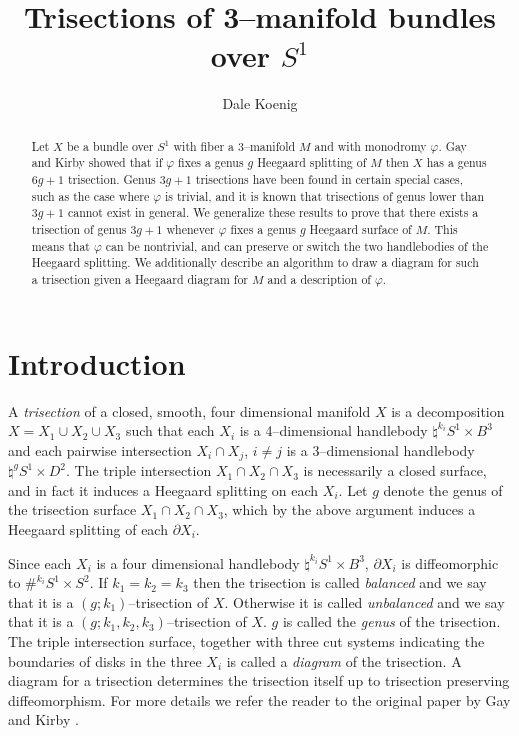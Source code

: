\documentclass[12pt]{amsart}
\newcommand{\del}{\partial }
\theoremstyle{definition}
\theoremstyle{remark}
\begin{document}
\title{Trisections of 3--manifold bundles over $S^1$}
\author{Dale Koenig}
\date{}


\begin{abstract}
Let $X$ be a bundle over $S^1$ with fiber a 3--manifold $M$ and with monodromy $\varphi$.  Gay and Kirby showed that if $\varphi$ fixes a genus $g$ Heegaard splitting of $M$ then $X$ has a genus $6g+1$ trisection.  Genus $3g+1$ trisections have been found in certain special cases, such as the case where $\varphi$ is trivial, and it is known that trisections of genus lower than $3g+1$ cannot exist in general.  We generalize these results to prove that there exists a trisection of genus $3g+1$ whenever $\varphi$ fixes a genus $g$ Heegaard surface of $M$.  This means that $\varphi$ can be nontrivial, and can preserve or switch the two handlebodies of the Heegaard splitting.  We additionally describe an algorithm to draw a diagram for such a trisection given a Heegaard diagram for $M$ and a description of $\varphi$.
\end{abstract}

\maketitle

\section{Introduction}
A \emph{trisection} of a closed, smooth, four dimensional manifold $X$ is a decomposition $X = X_1 \cup X_2 \cup X_3$ such that each $X_i$ is a 4--dimensional handlebody $\natural^{k_i} S^1 \times B^3$ and each pairwise intersection $X_i \cap X_j$, $i \not = j$ is a 3--dimensional handlebody $\natural^g S^1 \times D^2$.  The triple intersection $X_1 \cap X_2 \cap X_3$ is necessarily a closed surface, and in fact it induces a Heegaard splitting on each $X_i$.  Let $g$ denote the genus of the trisection surface $X_1 \cap X_2 \cap X_3$, which by the above argument induces a Heegaard splitting of each $\del X_i$.  

Since each $X_i$ is a four dimensional handlebody $\natural^{k_i} S^1 \times B^3$, $\del X_i$ is diffeomorphic to $\#^{k_i} S^1 \times S^2$.  If $k_1 = k_2 = k_3$ then the trisection is called \emph{balanced} and we say that it is a $(g;k_1)$--trisection of $X$.  Otherwise it is called \emph{unbalanced} and we say that it is a $(g;k_1,k_2,k_3)$--trisection of $X$.  $g$ is called the \emph{genus} of the trisection.  The triple intersection surface, together with three cut systems indicating the boundaries of disks in the three $X_i$ is called a \emph{diagram} of the trisection.  A diagram for a trisection determines the trisection itself up to trisection preserving diffeomorphism.  For more details we refer the reader to the original paper by Gay and Kirby \cite{GayKirby1}. 
\end{document}
